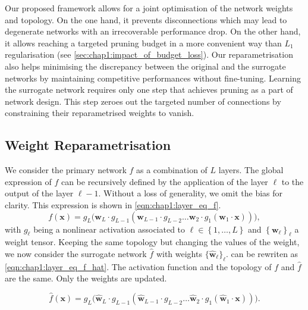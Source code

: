 Our proposed framework allows for a joint optimisation of the network weights
and topology. On the one hand, it prevents disconnections which may lead to
degenerate networks with an irrecoverable performance drop. On the other hand,
it allows reaching a targeted pruning budget in a more convenient way than $L_1$
regularisation (see \cref{sec:chap1:impact_of_budget_loss}). Our
reparametrisation also helps minimising the discrepancy between the original and
the surrogate networks by maintaining competitive performances without
fine-tuning. Learning the surrogate network requires only one step that achieves
pruning as a part of network design. This step zeroes out the targeted number of
connections by constraining their reparametrised weights to vanish.


\subsection{Weight Reparametrisation}
\label{sec:chap1:weight_reparam}

We consider the primary network $f$ as a combination of $L$ layers. The global
expression of $f$ can be recursively defined by the application of the layer $\ell$
to the output of the layer $\ell-1$. Without a loss of generality, we omit the
bias for clarity. This expression is shown in
\cref{eqn:chap1:layer_eq_f}.
\begin{equation}
\label{eqn:chap1:layer_eq_f}
f(\mathbf{x}) = g_L \big(\mathbf{w}_L \cdot g_{L-1}(\mathbf{w}_{L-1} \cdot g_{L-2} \dots
\mathbf{w}_2 \cdot g_1(\mathbf{w}_1 \cdot \mathbf{x}))\big),
\end{equation}
\noindent with $g_\ell$ being a nonlinear activation associated to $\ell \in
\left\{ 1,\dots, L \right\}$ and $\left\{ \mathbf{w}_\ell \right\}_\ell$ a
weight tensor. Keeping the same topology but changing the values of the weight,
we now consider the surrogate network $\hat{f}$ with weights
$\{\mathbf{\hat{w}}_\ell\}_\ell$.  can be rewriten as
\cref{eqn:chap1:layer_eq_f_hat}. The activation function and the topology of $f$
and $\hat{f}$ are the same. Only the weights are updated.

\begin{equation}
\label{eqn:chap1:layer_eq_f_hat}
\hat{f}(\mathbf{x}) = g_L \big(\mathbf{\hat w}_L \cdot g_{L-1}(\mathbf{\hat w}_{L-1} \cdot g_{L-2}
\dots\mathbf{\hat w}_2 \cdot g_1(\mathbf{\hat w}_1 \cdot \mathbf{x}))\big).
\end{equation}

